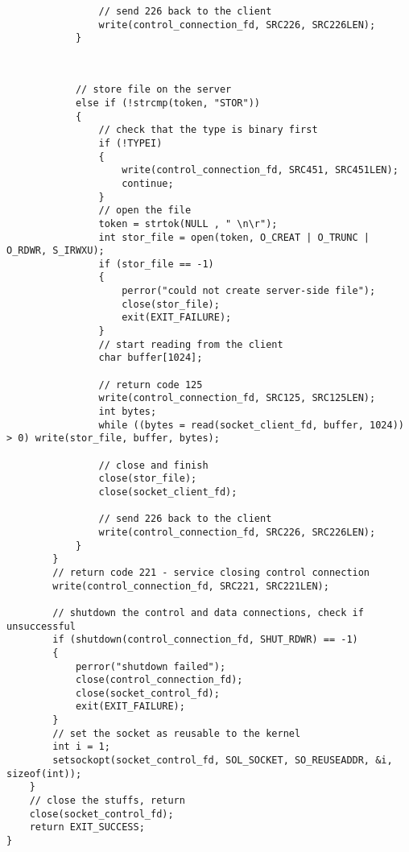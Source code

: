 \documentclass[12pt,letter,titlepage]{article}
\begin{document}
{{\begin{verbatim}
				// send 226 back to the client
				write(control_connection_fd, SRC226, SRC226LEN);
			}
			
\end{verbatim}
\pagebreak
\begin{verbatim}

			// store file on the server
			else if (!strcmp(token, "STOR"))
			{
				// check that the type is binary first
				if (!TYPEI) 
				{
					write(control_connection_fd, SRC451, SRC451LEN);
					continue;
				}
				// open the file
				token = strtok(NULL , " \n\r");
				int stor_file = open(token, O_CREAT | O_TRUNC | O_RDWR, S_IRWXU);
				if (stor_file == -1)
				{
					perror("could not create server-side file");
					close(stor_file);
					exit(EXIT_FAILURE);
				}
				// start reading from the client
				char buffer[1024];

				// return code 125
				write(control_connection_fd, SRC125, SRC125LEN);
				int bytes;
				while ((bytes = read(socket_client_fd, buffer, 1024)) > 0) write(stor_file, buffer, bytes);

				// close and finish
				close(stor_file);
				close(socket_client_fd);

				// send 226 back to the client
				write(control_connection_fd, SRC226, SRC226LEN);
			}
		}
		// return code 221 - service closing control connection
		write(control_connection_fd, SRC221, SRC221LEN);

		// shutdown the control and data connections, check if unsuccessful
		if (shutdown(control_connection_fd, SHUT_RDWR) == -1)
		{
			perror("shutdown failed");
			close(control_connection_fd);
			close(socket_control_fd);
			exit(EXIT_FAILURE);
		}
		// set the socket as reusable to the kernel
		int i = 1;
		setsockopt(socket_control_fd, SOL_SOCKET, SO_REUSEADDR, &i, sizeof(int));
	}
	// close the stuffs, return
	close(socket_control_fd);
	return EXIT_SUCCESS;
}
\end{verbatim}
}}
\end{document}
